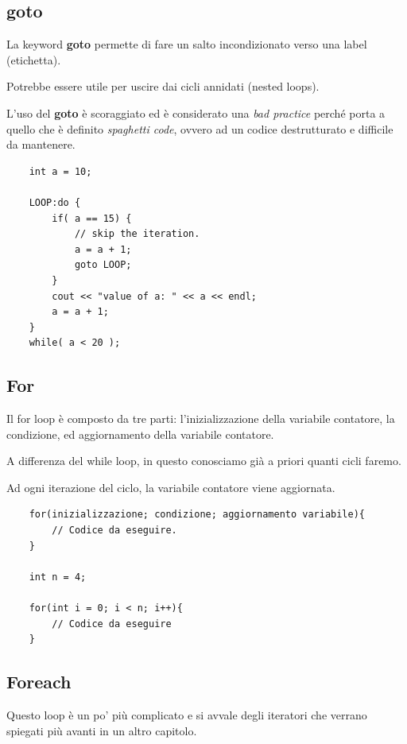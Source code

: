 \subsection{goto}

\textsf{\small La keyword \textbf{goto} permette di fare un salto incondizionato verso una label (etichetta).}

\textsf{\small Potrebbe essere utile per uscire dai cicli annidati (nested loops).}

\textsf{\small L'uso del \textbf{goto} è scoraggiato ed è considerato una \emph{bad practice} perché porta a quello che è definito \emph{spaghetti code}, ovvero ad un codice destrutturato e difficile da mantenere.} \\

\begin{lstlisting}
	int a = 10;
	
	LOOP:do {
		if( a == 15) {
			// skip the iteration.
			a = a + 1;
			goto LOOP;
		}
		cout << "value of a: " << a << endl;
		a = a + 1;
	} 
	while( a < 20 );
\end{lstlisting}

\subsection{For}

\textsf{\small Il for loop è composto da tre parti: l'inizializzazione della variabile contatore, la condizione, ed aggiornamento della variabile contatore. }

\textsf{\small A differenza del while loop, in questo conosciamo già a priori quanti cicli faremo.}

\textsf{\small Ad ogni iterazione del ciclo, la variabile contatore viene aggiornata.} \\

\begin{lstlisting}
	for(inizializzazione; condizione; aggiornamento variabile){
		// Codice da eseguire.
	}

	int n = 4;
	
	for(int i = 0; i < n; i++){
		// Codice da eseguire
	}
\end{lstlisting}

\subsection{Foreach}


\textsf{\small Questo loop è un po' più complicato e si avvale degli iteratori che verrano spiegati più avanti in un altro capitolo.} %

